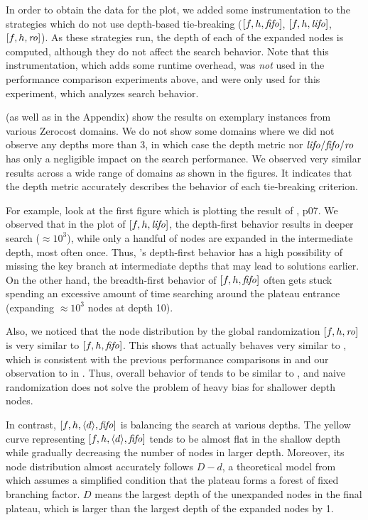 In order to obtain the data for the plot, we added some instrumentation to the strategies which do not use depth-based tie-breaking ($[f,h,{\text{\textit{fifo}}}]$, $[f,h,{\text{\textit{lifo}}}]$, $[f,h,{\text{\textit{ro}}}]$). As these strategies run, the depth of each of the expanded nodes is computed, although they do not affect the search behavior.
Note that this instrumentation, which adds some runtime overhead, was \emph{not}
used in the performance comparison experiments above, and were only used for this experiment, which analyzes search behavior.


 (as well as  in the Appendix) show the results on exemplary instances from 
various Zerocost domains.  We do not show some domains where we did not observe any depths more than 3, in which case
the depth metric nor ${\text{\textit{lifo}}}/{\text{\textit{fifo}}}/{\text{\textit{ro}}}$ has only a negligible impact on the search performance.
We observed very similar results across a wide range of domains as shown in the figures.
It indicates that the depth metric accurately describes the behavior of each tie-breaking criterion.

For example, look at the first figure which is plotting the result of , p07.
% 
We observed that in the plot of $[f,h,{\text{\textit{lifo}}}]$, the depth-first behavior results in deeper search ($\approx 10^3$), while
only a handful of nodes are expanded in the intermediate depth, most often once. Thus,  \lifo's depth-first
behavior has a high possibility of missing the key branch at intermediate depths that may lead to solutions earlier.
On the other hand, the breadth-first behavior of $[f,h,{\text{\textit{fifo}}}]$ often gets stuck spending an excessive amount of
time searching around the plateau entrance (expanding $\approx 10^3$ nodes at depth 10).

Also, we noticed that the node distribution by the global randomization $[f,h,{\text{\textit{ro}}}]$ is very similar to $[f,h,{\text{\textit{fifo}}}]$.
This shows that \ro actually behaves very similar to \fifo, which is consistent with the previous performance comparisons in  and our observation to \ro in .
Thus, overall behavior of \ro tends to be similar to \fifo, and naive randomization does not solve the problem of heavy bias for shallower depth nodes.

In contrast, $[f,h,{\left<d\right>},{\text{\textit{fifo}}}]$ is balancing the search at various depths.
The yellow curve representing $[f,h,{\left<d\right>},{\text{\textit{fifo}}}]$ tends to be almost flat in the shallow depth while gradually decreasing the number of nodes in larger depth.
Moreover, its node distribution almost accurately follows $D-d$, a theoretical model from  which assumes a simplified
condition that the plateau forms a forest of fixed branching factor.
$D$ means the largest depth of the unexpanded nodes in the final plateau, which is
larger than the largest depth of the expanded nodes by 1.

